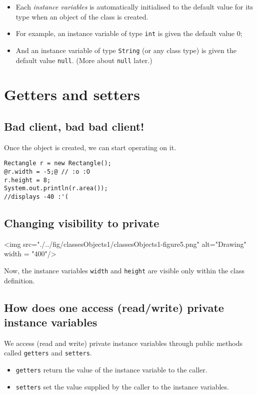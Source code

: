     \begin{itemize}
    \item Each {\em instance variables}	
          is automatically initialised to the default value for its type when an object of
          the class is created. 
    \item For example, an instance variable
          of type \lstinline!int! is given the default value 0;
    \item And an instance variable
          of type \lstinline!String! (or any class type)
          is given the default value \lstinline!null!.
          (More about \lstinline!null! later.)
    \end{itemize}

\section{Getters and setters}
\subsection{Bad client, bad bad client!}

Once the object is created, we can start operating on it.
\begin{lstlisting}[style=buggy]
Rectangle r = new Rectangle();
@r.width = -5;@ // :o :O
r.height = 8;
System.out.println(r.area()); 
//displays -40 :'(
\end{lstlisting}

\subsection{Changing visibility to private}



\vskip 0.1cm
\begin{center}
		<img src="./../fig/classesObjects1/classesObjects1-figure5.png" alt="Drawing" width = "400"/> 
\end{center}
\vskip 0.1cm

Now, the instance variables \texttt{width} and \texttt{height} are visible only within the class definition.

\subsection{How does one access (read/write) private instance variables}

We access (read and write) private instance variables through public methods called \texttt{getters} and \texttt{setters}.
\begin{itemize}
\item \texttt{getters} return the value of the instance variable to the caller.
\item \texttt{setters} set the value supplied by the caller to the instance variables.
\end{itemize}

